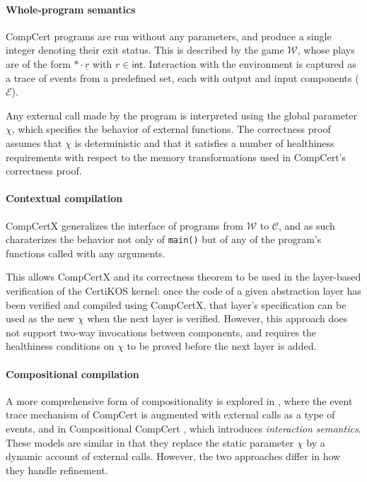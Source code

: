 \documentclass[sigplan,10pt,review,anonymous]{acmart}
\newcommand{\kw}[1]{\ensuremath{ \mathsf{#1} }}
\begin{document}
\paragraph{Whole-program semantics} %

CompCert programs are run without any parameters,
and produce a single integer denoting their exit status.
This is described by the game $\mathcal{W}$,
whose plays are of the form ${*} \cdot \underline{r}$
with $r \in \kw{int}$.
Interaction with the environment
is captured as a trace of events from a predefined set,
each with output and input components ($\mathcal{E}$).

Any external call made by the program
is interpreted using the global parameter $\chi$,
which specifies the behavior of external functions.
The correctness proof assumes that $\chi$ is deterministic
and that it satisfies a number of healthiness requirements
with respect to the memory transformations
used in CompCert's correctness proof.


\paragraph{Contextual compilation} %

CompCertX \cite{popl15} generalizes
the interface of programs
from $\mathcal{W}$ to $\mathcal{C}$,
and as such charaterizes the behavior
not only of \texttt{main()}
but of any of the program's functions
called with any arguments.

This allows CompCertX and its correctness theorem
to be used in the layer-based verification of
the CertiKOS kernel:
once the code of a given abstraction layer has been verified
and compiled using CompCertX,
that layer's specification can be used as the new $\chi$
when the next layer is verified.
However,
this approach does not support two-way invocations between components,
and requires the healthiness conditions on $\chi$
to be proved before the next layer is added.


\paragraph{Compositional compilation} %

A more comprehensive form of compositionality
is explored in \cite{cpp15},
where the event trace mechanism of CompCert
is augmented with external calls as a type of events,
and in Compositional CompCert \cite{compcompcert},
which introduces \emph{interaction semantics}.
These models are similar in that they replace
the static parameter $\chi$
by a dynamic account of external calls.
However, the two approaches differ in
how they handle refinement.
\end{document}
